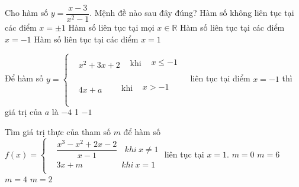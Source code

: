 \begin{ex}%
	
	Cho hàm số $y=\dfrac{x-3}{x^2-1}$. Mệnh đề nào sau đây đúng?
	\choice
	{\True Hàm số không liên tục tại các điểm $x=\pm 1$}
	{ Hàm số liên tục tại mọi $x\in \mathbb{R}$}
	{ Hàm số liên tục tại các điểm $x=-1$}
	{ Hàm số liên tục tại các điểm $x=1$}
\end{ex}
\begin{ex}%
	
	Để hàm số $y=\left\{ \begin{aligned}
		& {x^2}+3x+2\begin{matrix}
			{} & \text{khi}\begin{matrix}
				{} & x\le -1 \\
			\end{matrix} \\
		\end{matrix} \\
		& 4x+a\begin{matrix}
			{} & {} & \,\,\text{khi}\begin{matrix}
				{} & x>-1 \\
			\end{matrix} \\
		\end{matrix} \\
	\end{aligned} \right.$ liên tục tại điểm $x=-1$ thì giá trị của $a$ là
	\choice
	{ $-4$}
	{}
	{ 1}
	{ $-1$}
\end{ex}
\begin{ex}%
	
	Tìm giá trị thực của tham số $m$ để hàm số $f\left( x \right)=\left\{ \begin{aligned}
		& \dfrac{x^3-x^2+2x-2}{x-1}\ \ \ \ khi\ x\ne 1 \\
		& 3x+m\ \quad \quad \quad \quad \ \ khi\ x=1 \\
	\end{aligned} \right.$ liên tục tại $x=1$.
	\choice
	{\True $m=0$}
	{ $m=6$}
	{ $m=4$}
	{ $m=2$}
\end{ex}
